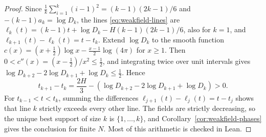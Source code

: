 \begin{proof}
Since $\frac1k\sum_{i=1}^k(i-1)^2=(k-1)(2k-1)/6$ and $-(k-1)a_k=\log D_k$, the lines
\eqref{eq:weakfield-lines} are $\ell_k(t)=(k-1)t+\log D_k-H(k-1)(2k-1)/6$, also for
$k=1$, and $\ell_{k+1}(t)-\ell_k(t)=t-t_k$. Extend $\log D_k$ to the smooth function
$c(x)=(x+\frac12)\log x-\frac{x-1}2\log(4\pi)$ for $x\ge1$. Then
$0<c''(x)=(x-\frac12)/x^2\le\frac12$, and integrating twice over unit intervals
gives $\log D_{k+2}-2\log D_{k+1}+\log D_k\le\frac12$. Hence
\[
 t_{k+1}-t_k=\frac{2H}{3}-(\log D_{k+2}-2\log D_{k+1}+\log D_k)>0.
\]
For $t_{k-1}<t<t_k$, summing the differences $\ell_{j+1}(t)-\ell_j(t)=t-t_j$
shows that line $k$ strictly exceeds every other line. The fields are strictly
decreasing, so the unique best support of size $k$ is $\{1,\ldots,k\}$, and
Corollary~\ref{cor:weakfield-phases} gives the conclusion for finite $N$. Most of this
arithmetic is checked in Lean.
\end{proof}
